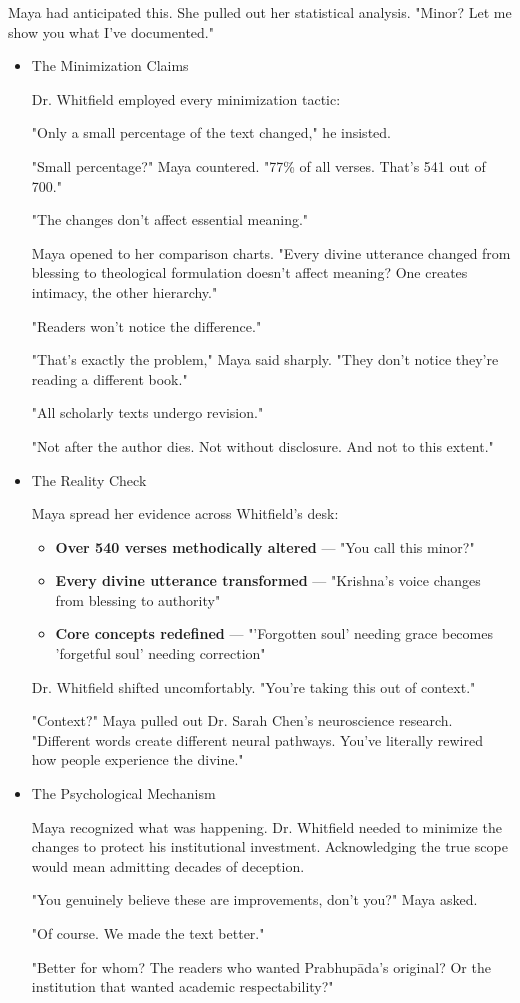 \documentclass[11pt,twoside]{book}
\begin{document}
Maya had anticipated this. She pulled out her statistical analysis. "Minor? Let me show you what I've documented."
\begin{itemize}
\item The Minimization Claims
\label{sec:org20ef73d}

Dr. Whitfield employed every minimization tactic:

"Only a small percentage of the text changed," he insisted.

"Small percentage?" Maya countered. "77\% of all verses. That's 541 out of 700."

"The changes don't affect essential meaning."

Maya opened to her comparison charts. "Every divine utterance changed from blessing to theological formulation doesn't affect meaning? One creates intimacy, the other hierarchy."

"Readers won't notice the difference."

"That's exactly the problem," Maya said sharply. "They don't notice they're reading a different book."

"All scholarly texts undergo revision."

"Not after the author dies. Not without disclosure. And not to this extent."
\item The Reality Check
\label{sec:orgb235d14}

Maya spread her evidence across Whitfield's desk:

\begin{itemize}
\item \textbf{\textbf{Over 540 verses methodically altered}} — "You call this minor?"
\item \textbf{\textbf{Every divine utterance transformed}} — "Krishna's voice changes from blessing to authority"
\item \textbf{\textbf{Core concepts redefined}} — "'Forgotten soul' needing grace becomes 'forgetful soul' needing correction"
\end{itemize}

Dr. Whitfield shifted uncomfortably. "You're taking this out of context."

"Context?" Maya pulled out Dr. Sarah Chen's neuroscience research. "Different words create different neural pathways. You've literally rewired how people experience the divine."
\item The Psychological Mechanism
\label{sec:org35495dd}

Maya recognized what was happening. Dr. Whitfield needed to minimize the changes to protect his institutional investment. Acknowledging the true scope would mean admitting decades of deception.

"You genuinely believe these are improvements, don't you?" Maya asked.

"Of course. We made the text better."

"Better for whom? The readers who wanted Prabhupāda's original? Or the institution that wanted academic respectability?"
\end{itemize}
\end{document}
